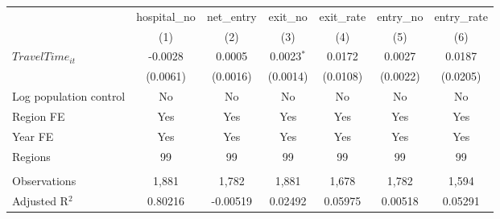 \begingroup
\centering
\begin{tabular}{lcccccc}
   \toprule
                          & hospital\_no  & net\_entry  & exit\_no     & exit\_rate  & entry\_no  & entry\_rate \\    
                          & (1)           & (2)         & (3)          & (4)         & (5)        & (6)\\  
   \midrule 
   $TravelTime_{it}$      & -0.0028       & 0.0005      & 0.0023$^{*}$ & 0.0172      & 0.0027     & 0.0187\\   
                          & (0.0061)      & (0.0016)    & (0.0014)     & (0.0108)    & (0.0022)   & (0.0205)\\   
   Log population control & No            & No          & No           & No          & No         & No\\  
   Region FE              & Yes           & Yes         & Yes          & Yes         & Yes        & Yes\\  
   Year FE                & Yes           & Yes         & Yes          & Yes         & Yes        & Yes\\  
   Regions                & 99            & 99          & 99           & 99          & 99         & 99\\  
    \\
   Observations           & 1,881         & 1,782       & 1,881        & 1,678       & 1,782      & 1,594\\  
   Adjusted R$^2$         & 0.80216       & -0.00519    & 0.02492      & 0.05975     & 0.00518    & 0.05291\\  
   \bottomrule
\end{tabular}
\par\endgroup
